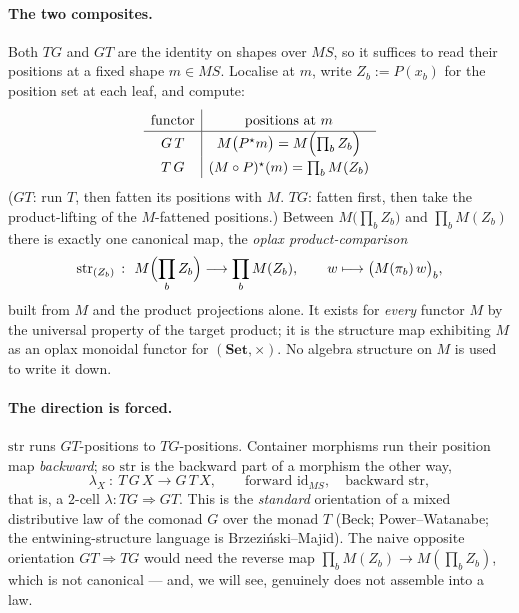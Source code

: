 \documentclass[11pt,a4paper]{book}
\newcommand{\Set}{\mathbf{Set}}
\newcommand{\id}{\mathrm{id}}
\newcommand{\str}{\mathrm{str}}
\theoremstyle{plain}
\theoremstyle{definition}
\theoremstyle{remark}
\begin{document}
\paragraph{The two composites.} Both $TG$ and $GT$ are the identity on shapes over $MS$, so it suffices
to read their positions at a fixed shape $m\in MS$. Localise at $m$, write $Z_{b}:=P(x_{b})$ for the
position set at each leaf, and compute:
\[
  \renewcommand{\arraystretch}{1.3}
  \begin{array}{c|c}
    \text{functor} & \text{positions at } m\\\hline
    G\,T & M\bigl(P^{\star}m\bigr)=M\Bigl(\textstyle\prod_{b}Z_{b}\Bigr)\\
    T\,G & (M\circ P)^{\star}(m)=\textstyle\prod_{b}M(Z_{b})
  \end{array}
\]
($GT$: run $T$, then fatten its positions with $M$. $TG$: fatten first, then take the product-lifting
of the $M$-fattened positions.) Between $M\bigl(\prod_{b}Z_{b}\bigr)$ and $\prod_{b}M(Z_{b})$ there is
exactly one canonical map, the \emph{oplax product-comparison}
\[
  \str_{(Z_{b})}\ \colon\ M\Bigl(\prod_{b}Z_{b}\Bigr)\longrightarrow\prod_{b}M(Z_{b}),
  \qquad w\longmapsto\bigl(M(\pi_{b})\,w\bigr)_{b},
\]
built from $M$ and the product projections alone. It exists for \emph{every} functor $M$ by the
universal property of the target product; it is the structure map exhibiting $M$ as an oplax monoidal
functor for $(\Set,\times)$. No algebra structure on $M$ is used to write it down.

\paragraph{The direction is forced.} $\str$ runs $GT$-positions to $TG$-positions. Container morphisms
run their position map \emph{backward}; so $\str$ is the backward part of a morphism the other way,
\[
  \lambda_{X}\ \colon\ T\,G\,X\longrightarrow G\,T\,X,\qquad
  \text{forward }\id_{MS},\quad\text{backward }\str,
\]
that is, a $2$-cell $\lambda\colon TG\Rightarrow GT$. This is the \emph{standard} orientation of a mixed
distributive law of the comonad $G$ over the monad $T$ (Beck; Power--Watanabe; the entwining-structure
language is Brzezi\'nski--Majid). The naive opposite orientation $GT\Rightarrow TG$ would need the
reverse map $\prod_{b}M(Z_{b})\to M(\prod_{b}Z_{b})$, which is not canonical --- and, we will see,
genuinely does not assemble into a law.
\end{document}
